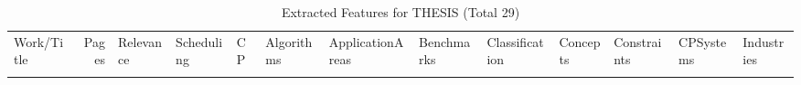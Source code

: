 {\scriptsize
\begin{longtable}{>{\raggedright\arraybackslash}p{3cm}r>{\raggedright\arraybackslash}p{1.0cm}>{\raggedright\arraybackslash}p{ 1.50cm}>{\raggedright\arraybackslash}p{ 1.50cm}>{\raggedright\arraybackslash}p{ 1.50cm}>{\raggedright\arraybackslash}p{ 1.50cm}>{\raggedright\arraybackslash}p{ 1.50cm}>{\raggedright\arraybackslash}p{ 1.50cm}>{\raggedright\arraybackslash}p{ 1.50cm}>{\raggedright\arraybackslash}p{ 1.50cm}>{\raggedright\arraybackslash}p{ 1.50cm}>{\raggedright\arraybackslash}p{ 1.50cm}}
\rowcolor{white}\caption{Extracted Features for THESIS (Total 29)}\\ \toprule
\rowcolor{white}Work/Title & Pages & Relevance & Scheduling& CP& Algorithms& ApplicationAreas& Benchmarks& Classification& Concepts& Constraints& CPSystems& Industries\\ \midrule\endhead
\bottomrule
\endfoot

\end{longtable}}
